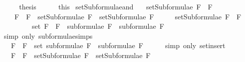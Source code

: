 \begin{isabellebody}
\ \ \isamarkupfalse%
\ \isamarkupfalse%
\ {\isacharquery}thesis\isanewline
\ \ \ \ \isamarkupfalse%
\ this\isanewline
{}\isamarkupfalse%
%
\endisatagproof
{\isafoldproof}%
%
\isadelimproof
\isanewline
%
\endisadelimproof
\isanewline
{}\isamarkupfalse%
\ setSubformulae{\isacharunderscore}and{\isacharcolon}\ \isanewline
\ \ {\isachardoublequoteopen}setSubformulae\ {\isacharparenleft}F{}\ \isactrlbold {\isasymand}\ F{}{\isacharparenright}\ \isanewline
\ \ \ {\isacharequal}\ {\isacharbraceleft}F{}\ \isactrlbold {\isasymand}\ F{}{\isacharbraceright}\ {\isasymunion}\ {\isacharparenleft}setSubformulae\ F{}\ {\isasymunion}\ setSubformulae\ F{}{\isacharparenright}{\isachardoublequoteclose}\isanewline
%
\isadelimproof
%
\endisadelimproof
%
\isatagproof
{}\isamarkupfalse%
\ {\isacharminus}\isanewline
\ \ \isamarkupfalse%
\ {\isachardoublequoteopen}setSubformulae\ {\isacharparenleft}F{}\ \isactrlbold {\isasymand}\ F{}{\isacharparenright}\ \isanewline
\ \ \ \ \ \ \ \ {\isacharequal}\ set\ {\isacharparenleft}{\isacharparenleft}F{}\ \isactrlbold {\isasymand}\ F{}{\isacharparenright}\ {\isacharhash}\ {\isacharparenleft}subformulae\ F{}\ {\isacharat}\ subformulae\ F{}{\isacharparenright}{\isacharparenright}{\isachardoublequoteclose}\isanewline
\ \ \ \ \isamarkupfalse%
\ {\isacharparenleft}simp\ only{\isacharcolon}\ subformulae{\isachardot}simps{\isacharparenleft}{}{\isacharparenright}{\isacharparenright}\isanewline
\ \ \isamarkupfalse%
\ \isamarkupfalse%
\ {\isachardoublequoteopen}{\isasymdots}\ {\isacharequal}\ {\isacharbraceleft}F{}\ \isactrlbold {\isasymand}\ F{}{\isacharbraceright}\ {\isasymunion}\ {\isacharparenleft}set\ {\isacharparenleft}subformulae\ F{}\ {\isacharat}\ subformulae\ F{}{\isacharparenright}{\isacharparenright}{\isachardoublequoteclose}\isanewline
\ \ \ \ \isamarkupfalse%
\ {\isacharparenleft}simp\ only{\isacharcolon}\ set{\isacharunderscore}insert{\isacharparenright}\isanewline
\ \ \isamarkupfalse%
\ \isamarkupfalse%
\ {\isachardoublequoteopen}{\isasymdots}\ {\isacharequal}\ {\isacharbraceleft}F{}\ \isactrlbold {\isasymand}\ F{}{\isacharbraceright}\ {\isasymunion}\ {\isacharparenleft}setSubformulae\ F{}\ {\isasymunion}\ setSubformulae\ F{}{\isacharparenright}{\isachardoublequoteclose}\isanewline

\end{isabellebody}

